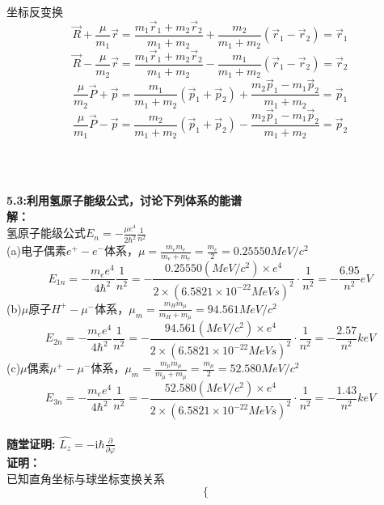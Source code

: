 \documentclass[a4paper]{article}
\newcommand{\qed}{
    \rightline{Q.E.D.}\\
    }
\newcommand{\dis}{\displaystyle}
\begin{document}
\begin{CJK*}{UTF8}{song}
{    坐标反变换
    $$\vec{R} + \frac{\mu}{m_{1}}\vec{r} =
        \frac{m_{1}\vec{r}_{1}+
        m_{2}\vec{r}_{2}}{m_{1}+m_{2}}+\frac{m_{2}}{m_{1}+m_{2}}
        (\vec{r}_{1}-\vec{r}_{2})
        =\vec{r}_{1}$$
    $$\vec{R} - \frac{\mu}{m_{2}}\vec{r} =
        \frac{m_{1}\vec{r}_{1}+m_{2}\vec{r}_{2}}{m_{1}+m_{2}}
        -\frac{m_{1}}{m_{1}+m_{2}}(\vec{r}_{1}-\vec{r}_{2})
        =\vec{r}_{2}$$
    $$\frac{\mu}{m_{2}}\vec{P}+\vec{p}
        = \frac{m_{1}}{m_{1}+m_{2}}(\vec{p}_{1}+\vec{p}_{2})
        +\frac{m_{2}\vec{p}_{1}-m_{1}\vec{p}_{2}}{m_{1}+m_{2}}
        =\vec{p}_{1}$$
    $$\frac{\mu}{m_{1}}\vec{P}-\vec{p}
        = \frac{m_{2}}{m_{1}+m_{2}}(\vec{p}_{1}+\vec{p}_{2})
        -\frac{m_{2}\vec{p}_{1}-m_{1}\vec{p}_{2}}{m_{1}+m_{2}}
        =\vec{p}_{2}$$
    \qed
    }\\[20pt]
    \noindent \textbf{5.3:利用氢原子能级公式，讨论下列体系的能谱}\\[8pt]
    {
    \noindent\textbf{解：}\\[5pt]
    氢原子能级公式$\dis E_{n}=-\frac{\mu e^{4}}{2\hbar^{2}}\frac{1}{n^{2}}$\\
    (a)电子偶素$e^{+}-e^{-}$体系，$\dis\mu = \frac{m_{e}m_{e}}{m_{e}+m_{e}}
        =\frac{m_{e}}{2}=0.25550MeV/c^{2}$\\
    $$E_{1n}=-\frac{m_{e}e^{4}}{4\hbar^{2}}\frac{1}{n^{2}}=
        -\frac{0.25550(MeV/c^{2})\times e^{4}}{2\times (6.5821\times 10^{-22}MeVs)^{2}}\cdot\frac{1}{n^{2}}
        =-\frac{6.95}{n^{2}}eV$$
    (b)$\mu$原子$H^{+}-\mu^{-}$体系，$\dis {\mu}_{m} = \frac{m_{H}m_{\mu}}{m_{H}+m_{\mu}}
        =94.561MeV/c^{2}$\\
    $$E_{2n}=-\frac{m_{e}e^{4}}{4\hbar^{2}}\frac{1}{n^{2}}=
        -\frac{94.561(MeV/c^{2})\times e^{4}}{2\times (6.5821\times 10^{-22}MeVs)^{2}}\cdot\frac{1}{n^{2}}
        =-\frac{2.57}{n^{2}}keV$$
    (c)$\mu$偶素$\mu^{+}-\mu^{-}$体系，$\dis\mu_{m} = \frac{m_{\mu}m_{\mu}}{m_{\mu}+m_{\mu}}
        =\frac{m_{\mu}}{2}=52.580MeV/c^{2}$\\
    $$E_{3n}=-\frac{m_{e}e^{4}}{4\hbar^{2}}\frac{1}{n^{2}}=
        -\frac{52.580(MeV/c^{2})\times e^{4}}{2\times (6.5821\times 10^{-22}MeVs)^{2}}\cdot\frac{1}{n^{2}}
        =-\frac{1.43}{n^{2}}keV$$ 
    }\\[20pt]
    \noindent \textbf{随堂证明:}\quad
        $\dis\hat{L_{z}}=-\mathrm{i}\hbar\frac{\partial}{\partial\varphi}$\\[8pt]
    {
    \noindent\textbf{证明：}\\[5pt]
    已知直角坐标与球坐标变换关系
    \[\left\{
    \begin{array}{ll}

\end{array}\]}
\end{CJK*}
\end{document}
